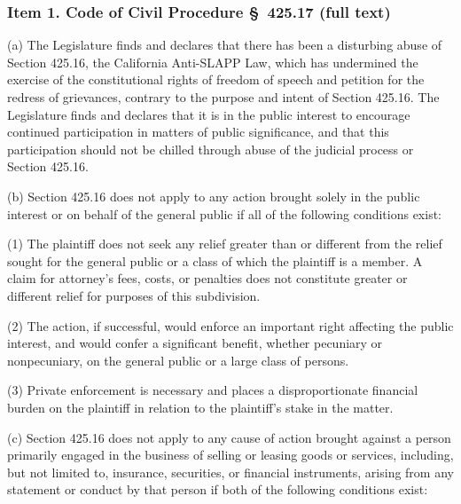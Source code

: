 
\subsubsection*{Item 1. Code of Civil Procedure \S~425.17 (full text)}

\begin{quoting}
\noindent (a) The Legislature finds and declares that there has been a disturbing abuse of Section 425.16, the California Anti-SLAPP Law, which has undermined the exercise of the constitutional rights of freedom of speech and petition for the redress of grievances, contrary to the purpose and intent of Section 425.16. The Legislature finds and declares that it is in the public interest to encourage continued participation in matters of public significance, and that this participation should not be chilled through abuse of the judicial process or Section 425.16.

\noindent (b) Section 425.16 does not apply to any action brought solely in the public interest or on behalf of the general public if all of the following conditions exist:

\noindent (1) The plaintiff does not seek any relief greater than or different from the relief sought for the general public or a class of which the plaintiff is a member. A claim for attorney's fees, costs, or penalties does not constitute greater or different relief for purposes of this subdivision.

\noindent (2) The action, if successful, would enforce an important right affecting the public interest, and would confer a significant benefit, whether pecuniary or nonpecuniary, on the general public or a large class of persons.

\noindent (3) Private enforcement is necessary and places a disproportionate financial burden on the plaintiff in relation to the plaintiff's stake in the matter.

\noindent (c) Section 425.16 does not apply to any cause of action brought against a person primarily engaged in the business of selling or leasing goods or services, including, but not limited to, insurance, securities, or financial instruments, arising from any statement or conduct by that person if both of the following conditions exist:


\end{quoting}
